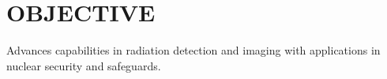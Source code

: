 \section{\small{OBJECTIVE}}

Advances capabilities in radiation detection and imaging with applications in nuclear security and safeguards.
